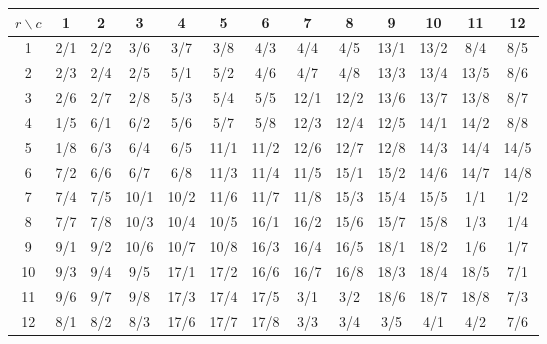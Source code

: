 \begin{center}
\footnotesize
\setlength{\tabcolsep}{2pt}
\renewcommand{\arraystretch}{1.05}
\begin{tabular}{c|cccccccccccc}
\toprule
$r\backslash c$ & 1 & 2 & 3 & 4 & 5 & 6 & 7 & 8 & 9 & 10 & 11 & 12 \\
\midrule
1 & 2/1 & 2/2 & 3/6 & 3/7 & 3/8 & 4/3 & 4/4 & 4/5 & 13/1 & 13/2 & 8/4 & 8/5 \\
2 & 2/3 & 2/4 & 2/5 & 5/1 & 5/2 & 4/6 & 4/7 & 4/8 & 13/3 & 13/4 & 13/5 & 8/6 \\
3 & 2/6 & 2/7 & 2/8 & 5/3 & 5/4 & 5/5 & 12/1 & 12/2 & 13/6 & 13/7 & 13/8 & 8/7 \\
4 & 1/5 & 6/1 & 6/2 & 5/6 & 5/7 & 5/8 & 12/3 & 12/4 & 12/5 & 14/1 & 14/2 & 8/8 \\
5 & 1/8 & 6/3 & 6/4 & 6/5 & 11/1 & 11/2 & 12/6 & 12/7 & 12/8 & 14/3 & 14/4 & 14/5 \\
6 & 7/2 & 6/6 & 6/7 & 6/8 & 11/3 & 11/4 & 11/5 & 15/1 & 15/2 & 14/6 & 14/7 & 14/8 \\
7 & 7/4 & 7/5 & 10/1 & 10/2 & 11/6 & 11/7 & 11/8 & 15/3 & 15/4 & 15/5 & 1/1 & 1/2 \\
8 & 7/7 & 7/8 & 10/3 & 10/4 & 10/5 & 16/1 & 16/2 & 15/6 & 15/7 & 15/8 & 1/3 & 1/4 \\
9 & 9/1 & 9/2 & 10/6 & 10/7 & 10/8 & 16/3 & 16/4 & 16/5 & 18/1 & 18/2 & 1/6 & 1/7 \\
10 & 9/3 & 9/4 & 9/5 & 17/1 & 17/2 & 16/6 & 16/7 & 16/8 & 18/3 & 18/4 & 18/5 & 7/1 \\
11 & 9/6 & 9/7 & 9/8 & 17/3 & 17/4 & 17/5 & 3/1 & 3/2 & 18/6 & 18/7 & 18/8 & 7/3 \\
12 & 8/1 & 8/2 & 8/3 & 17/6 & 17/7 & 17/8 & 3/3 & 3/4 & 3/5 & 4/1 & 4/2 & 7/6 \\
\bottomrule
\end{tabular}
\end{center}

